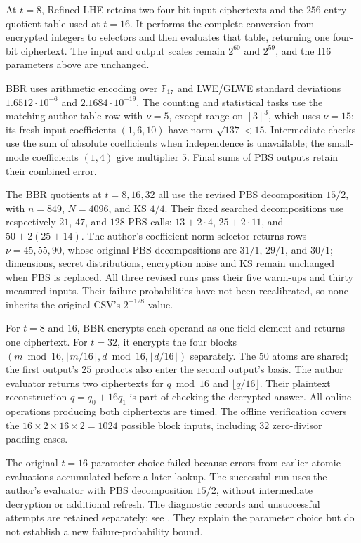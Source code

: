 \documentclass[11pt,a4paper]{article}
\begin{document}
At $t=8$, Refined-LHE retains two four-bit input ciphertexts and the $256$-entry quotient table used at $t=16$. It performs the complete conversion from encrypted integers to selectors and then evaluates that table, returning one four-bit ciphertext. The input and output scales remain $2^{60}$ and $2^{59}$, and the I16 parameters above are unchanged.

BBR uses arithmetic encoding over $\mathbb F_{17}$ and LWE/GLWE standard deviations $1.6512\cdot10^{-6}$ and $2.1684\cdot10^{-19}$. The counting and statistical tasks use the matching author-table row with $\nu=5$, except range on $[3]^3$, which uses $\nu=15$: its fresh-input coefficients $(1,6,10)$ have norm $\sqrt{137}<15$. Intermediate checks use the sum of absolute coefficients when independence is unavailable; the small-mode coefficients $(1,4)$ give multiplier $5$. Final sums of PBS outputs retain their combined error.

The BBR quotients at $t=8,16,32$ all use the revised PBS decomposition $15/2$, with $n=849$, $N=4096$, and KS $4/4$. Their fixed searched decompositions use respectively $21$, $47$, and $128$ PBS calls: $13+2\cdot4$, $25+2\cdot11$, and $50+2(25+14)$. The author's coefficient-norm selector returns rows $\nu=45,55,90$, whose original PBS decompositions are $31/1$, $29/1$, and $30/1$; dimensions, secret distributions, encryption noise and KS remain unchanged when PBS is replaced. All three revised runs pass their five warm-ups and thirty measured inputs. Their failure probabilities have not been recalibrated, so none inherits the original CSV's $2^{-128}$ value.

For $t=8$ and $16$, BBR encrypts each operand as one field element and returns one ciphertext. For $t=32$, it encrypts the four blocks $(m\bmod16,\lfloor m/16\rfloor,d\bmod16,\lfloor d/16\rfloor)$ separately. The $50$ atoms are shared; the first output's $25$ products also enter the second output's basis. The author evaluator returns two ciphertexts for $q\bmod16$ and $\lfloor q/16\rfloor$. Their plaintext reconstruction $q=q_0+16q_1$ is part of checking the decrypted answer. All online operations producing both ciphertexts are timed. The offline verification covers the $16\times2\times16\times2=1024$ possible block inputs, including $32$ zero-divisor padding cases.

The original $t=16$ parameter choice failed because errors from earlier atomic evaluations accumulated before a later lookup. The successful run uses the author's evaluator with PBS decomposition $15/2$, without intermediate decryption or additional refresh. The diagnostic records and unsuccessful attempts are retained separately; see . They explain the parameter choice but do not establish a new failure-probability bound.
\end{document}
